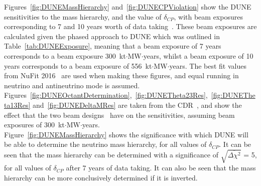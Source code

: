 Figures~\ref{fig:DUNEMassHierarchy} and~\ref{fig:DUNECPViolation} show the DUNE sensitivities to the mass hierarchy, and the value of $\delta_{CP}$, with beam exposures corresponding to 7 and 10 years worth of data taking~\citep{Elizabeth_01_17}. These beam exposures are calculated given the phased approach to DUNE which was outlined in Table~\ref{tab:DUNEExposure}, meaning that a beam exposure of 7 years corresponds to a beam exposure 300~kt$\cdot$MW$\cdot$years, whilst a beam exposure of 10 years corresponds to a beam exposure of 556~kt$\cdot$MW$\cdot$years. The best fit values from NuFit 2016~\citep{NuFit2016} are used when making these figures, and equal running in neutrino and antineutrino mode is assumed. Figures~\ref{fig:DUNEOctantDetermination},~\ref{fig:DUNETheta23Res},~\ref{fig:DUNETheta13Res} and~\ref{fig:DUNEDeltaMRes} are taken from the CDR~\citep{DUNECDR_V2}, and show the effect that the two beam designs~\citep{DUNECDR_V3} have on the sensitivities, assuming beam exposures of 300~kt$\cdot$MW$\cdot$years. \\

Figure~\ref{fig:DUNEMassHierarchy} shows the significance with which DUNE will be able to determine the neutrino mass hierarchy, for all values of $\delta_{CP}$. It can be seen that the mass hierarchy can be determined with a significance of $\sqrt{\overline{\Delta{\chi^2}}}$ = 5, for all values of $\delta_{CP}$ after 7 years of data taking. It can also be seen that the mass hierarchy can be more conclusively determined if it is inverted. \\

